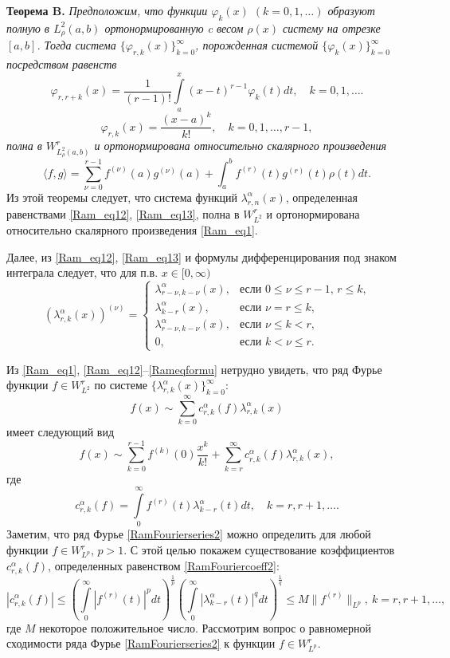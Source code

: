 \documentclass[a4paper,12pt]{article}
\begin{document}
\textbf{Теорема B.}
\textit{
Предположим, что функции $\varphi_k(x)$ $(k=0,1,\ldots)$ образуют полную в $L^2_{\rho}(a,b)$ ортонормированную c весом $\rho(x)$ систему на отрезке $[a,b]$. Тогда система $\{\varphi_{r,k}(x)\}_{k=0}^\infty$, порожденная системой $\{\varphi_{k}(x)\}_{k=0}^\infty$ посредством равенств
$$
\varphi_{r,r+k}(x) =\frac{1}{(r-1)!}\int\limits_a^x(x-t)^{r-1}\varphi_{k}(t)dt, \quad k=0,1,\ldots.
$$
$$
\varphi_{r,k}(x) =\frac{(x-a)^k}{k!}, \quad k=0,1,\ldots, r-1,
$$
полна  в $W^r_{L^2_{\rho}(a,b)}$ и ортонормирована относительно скалярного произведения
$$
\langle f,g\rangle=\sum_{\nu=0}^{r-1}f^{(\nu)}(a)g^{(\nu)}(a)+\int_{a}^{b} f^{(r)}(t)g^{(r)}(t)\rho(t) dt.
$$
}
Из этой теоремы следует, что система функций $\lambda_{r,n}^\alpha(x)$, определенная равенствами \eqref{Ram_eq12}, \eqref{Ram_eq13}, полна в $W^r_{L^2}$ и ортонормирована относительно скалярного произведения \eqref{Ram_eq1}.

Далее, из \eqref{Ram_eq12}, \eqref{Ram_eq13} и формулы дифференцирования под знаком интеграла \cite[п. 509, с. 667]{Ramlib5} следует, что для п.в. $x\in[0,\infty)$
\begin{equation}\label{Rameqformu}
(\lambda_{r,k}^\alpha(x))^{(\nu)} =
\begin{cases}
\lambda_{r-\nu,k-\nu}^\alpha(x),&\text{если $0\le\nu\le r-1$, $r\le k$,}\\
\lambda_{k-r}^\alpha(x),&\text{если $\nu=r\le k$,}\\
\lambda_{r-\nu,k-\nu}^\alpha(x),&\text{если $\nu\le k< r$,}\\
0,&\text{если $k< \nu\le r$}.
\end{cases}
\end{equation}

Из \eqref{Ram_eq1}, \eqref{Ram_eq12}--\eqref{Rameqformu} нетрудно увидеть, что ряд Фурье функции $f\in W^r_{L^2}$ по системе  $\{\lambda^\alpha_{r,k}(x)\}_{k=0}^\infty$:
\begin{equation*}
f(x)\sim \sum_{k=0}^{\infty}c_{r,k}^\alpha(f)\lambda_{r,k}^\alpha(x)
\end{equation*}
имеет следующий вид
\begin{equation}\label{RamFourierseries2}
f(x)\sim \sum_{k=0}^{r-1}f^{(k)}(0)\frac{x^k}{k!}+\sum_{k=r}^{\infty} c_{r,k}^\alpha(f)\lambda_{r,k}^\alpha(x),
\end{equation}
где
\begin{equation}\label{RamFouriercoeff2}
c_{r,k}^\alpha(f)=\int\limits_0^\infty f^{(r)}(t)\lambda_{k-r}^\alpha(t)dt, \quad k=r, r+1, \ldots.
\end{equation}
Заметим, что ряд Фурье \eqref{RamFourierseries2} можно определить для любой функции $f\in W^r_{L^p}$, $p>1$. С этой целью покажем существование коэффициентов $c_{r,k}^\alpha(f)$, определенных равенством \eqref{RamFouriercoeff2}:
$$
|c_{r,k}^\alpha(f)|\leq \left(\int\limits_0^\infty|f^{(r)}(t)|^p dt\right)^{\frac{1}{p}}
\left(\int\limits_0^\infty|\lambda_{k-r}^\alpha(t)|^q dt\right)^{\frac{1}{q}}\leq M\|f^{(r)}\|_{L^p},\ k=r, r+1, \ldots,
$$
где $M$ некоторое положительное число.
Рассмотрим вопрос о равномерной сходимости ряда Фурье \eqref{RamFourierseries2} к функции $f\in W^r_{L^p}$.
\end{document}
